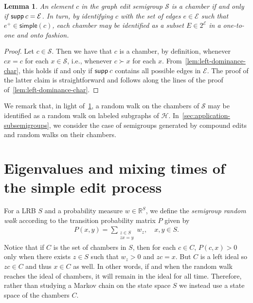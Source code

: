 \documentclass[11pt,a4paper]{article}
\newcommand{\supp}{{\mathsf{supp }\hspace{.075cm}}}
\newcommand{\simple}[1]{\mathrm{\mathsf{simple}}({#1})}
\newtheorem{lemma}[theorem]{Lemma}
\begin{document}
\begin{lemma}\label{lem:chambers-of-s}
    An element $c$ in the graph edit semigroup $\mathcal{S}$ is a chamber if and only if $\supp{c} = {\mathcal{E}}$. In turn, by identifying $c$ with the set of edges $e\in{\mathcal{E}}$ such that ${e^+} \in\simple{c}$, each chamber may be identified as a subset $E\in 2^{\mathcal{E}}$ in a one-to-one and onto fashion.
\end{lemma}

\begin{proof}
    Let $c\in \mathcal{S}$. Then we have that $c$ is a chamber, by definition, whenever $cx = c$ for each $x\in \mathcal{S}$, i.e., whenever $c\succ x$ for each $x$. From~\cref{lem:left-dominance-char}, this holds if and only if $\supp{c}$ contains all possible edges in $\mathcal{E}$. The proof of the latter claim is straightforward and follows along the lines of the proof of~\cref{lem:left-dominance-char}.
\end{proof}

We remark that, in light of~\cref{lem:chambers-of-s}, a random walk on the chambers of $\mathcal{S}$ may be identified as a random walk on labeled subgraphs of $\mathcal{H}$. In~\cref{sec:application-subsemigroups}, we consider the case of semigroups generated by compound edits and random walks on their chambers.

\section{Eigenvalues and mixing times of the simple edit process}\label{sec:walks-on-chambers}

For a LRB $S$ and a probability measure $w \in\mathbb{R}^S$, we define the \textit{semigroup random walk} according to the transition probability matrix $P$ given by
    \begin{align}\label{eq:semi-rw}
        P(x, y) = \sum_{\substack{z\in S\\zx=y}} w_z, \quad x, y\in S.
    \end{align}
Notice that if $C$ is the set of chambers in $S$, then for each $c\in C$, $P(c, x) > 0$ only when there exists $z\in S$ such that $w_z>0$ and $zc=x$. But $C$ is a left ideal so $zc\in C$ and thus $x\in C$ as well. In other words, if and when the random walk reaches the ideal of chambers, it will remain in the ideal for all time. Therefore, rather than studying a Markov chain on the state space $S$ we instead use a state space of the chambers $C$. 
\end{document}
